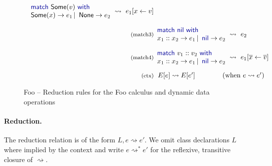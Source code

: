 \documentclass[pldi-cameraready]{sigplanconf-pldi16}
\newcommand{\kvd}[1]{\textnormal{\textcolor{kvdclr}{\sffamily #1}}}
\newcommand{\ident}[1]{\textnormal{\sffamily #1}}
\newcommand{\reduce}{\rightsquigarrow}
\begin{document}
\begin{figure}
\begin{equation*}
\begin{array}{rl}
\begin{array}{l}
    \kvd{match}~\ident{Some}(v)~\kvd{with} \\
    \ident{Some}(x) \rightarrow e_1 \,|\, \ident{None} \rightarrow e_2
 \end{array} \hspace{-0.5em} ~\reduce~ e_1[x\leftarrow v]\\
 \\[-0.2em]
 \textnormal{\footnotesize{(match3)}}&
 \hspace{-1em}
 \begin{array}{l}
  \kvd{match}~\kvd{nil}~\kvd{with} \\[0em]
  x_1::x_2 \rightarrow e_1 \,|\, \kvd{nil} \rightarrow e_2
 \end{array} \hspace{-0.5em} ~\reduce~ e_2\\
 \\[-0.2em]
 \textnormal{\footnotesize{(match4)}}&
 \hspace{-1em}
 \begin{array}{l}
  \kvd{match}~v_1::v_2~\kvd{with} \\[0em]
  x_1::x_2 \rightarrow e_1 \,|\, \kvd{nil} \rightarrow e_2
 \end{array} \hspace{-0.5em} ~\reduce~ e_1[\overline{x}\leftarrow\overline{v}] \\
\\[-0.3em]
\textnormal{\footnotesize{(ctx)}}&
\hspace{-0.4em}
E[e] \reduce E[e'] \qquad\qquad(\textnormal{when}~e \reduce e')\\
\end{array}
\end{equation*}

\caption{Foo -- Reduction rules for the Foo calculus and dynamic data operations}
\label{fig:ff-reduction}
\end{figure}


\paragraph{Reduction.}
The reduction relation is of the form $L, e \reduce e'$. We omit class declarations
$L$ where implied by the context and write $e \reduce^{*} e'$ for
the reflexive, transitive closure of $\reduce$.
\end{document}

